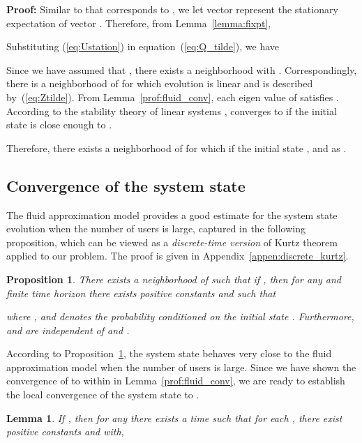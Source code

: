 \documentclass[11pt,twocolumn]{IEEEtran}
\newtheorem{proposition}{Proposition}
\newtheorem{lemma}{Lemma}
\begin{document}
\noindent \textbf{Proof:} Similar to  that corresponds to , we let vector  represent the stationary expectation of vector . Therefore, from Lemma~\ref{lemma:fixpt},


Substituting (\ref{eq:Ustation}) in equation~(\ref{eq:Q_tilde}), we have


Since we have assumed that , there exists a  neighborhood  with . Correspondingly, there is a neighborhood of  for which  evolution is linear and is described by~(\ref{eq:Ztilde}). From Lemma~\ref{prof:fluid_conv}, each eigen value  of  satisfies . According to the stability theory of linear systems \cite{Khalil},  converges to  if the initial state is close enough to .

Therefore, there exists a  neighborhood of  for which if the initial state ,  and  as . 

\subsection{Convergence of the system state}

The fluid approximation model provides a good estimate for the system state evolution when the number of users is large, captured in the following proposition, which can be viewed as a \emph{discrete-time version} of Kurtz theorem \cite{Kurtz} applied to our problem. The proof is given in Appendix~\ref{appen:discrete_kurtz}.

\begin{proposition}
\label{prop:discrete_kurtz}
There exists a neighborhood  of  such that if , then for any  and finite time horizon  there exists positive constants  and  such that

where , and  denotes the probability conditioned on the initial state . Furthermore,  and  are independent of  and .
\end{proposition}

According to Proposition~\ref{prop:discrete_kurtz}, the system state  behaves very close to the fluid approximation model  when the number of users  is large. Since we have shown the convergence of  to  within  in Lemma~\ref{prof:fluid_conv}, we are ready to establish the local convergence of the system state  to .

\begin{lemma}
\label{lemma:Kurtz_Index}
If , then for any  there exists a time  such that for each , there exist positive constants  and  with,

\end{lemma}
\end{document}
